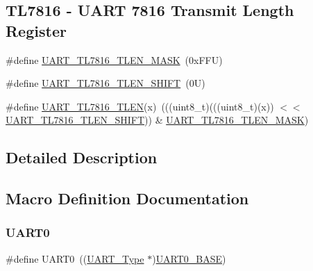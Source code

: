 \subsection*{T\+L7816 -\/ U\+A\+RT 7816 Transmit Length Register}
\begin{DoxyCompactItemize}
\item 
\#define \mbox{\hyperlink{group___u_a_r_t___register___masks_ga000fb6043015c4cb478d32febfb4a913}{U\+A\+R\+T\+\_\+\+T\+L7816\+\_\+\+T\+L\+E\+N\+\_\+\+M\+A\+SK}}~(0x\+F\+F\+U)
\item 
\#define \mbox{\hyperlink{group___u_a_r_t___register___masks_gaafcee96c5728fbbbc56c3b2ea55bd753}{U\+A\+R\+T\+\_\+\+T\+L7816\+\_\+\+T\+L\+E\+N\+\_\+\+S\+H\+I\+FT}}~(0\+U)
\item 
\#define \mbox{\hyperlink{group___u_a_r_t___register___masks_gaf537ccbe6ddd913ae8f3a988393519e4}{U\+A\+R\+T\+\_\+\+T\+L7816\+\_\+\+T\+L\+EN}}(x)~(((uint8\+\_\+t)(((uint8\+\_\+t)(x)) $<$$<$ \mbox{\hyperlink{group___u_a_r_t___register___masks_gaafcee96c5728fbbbc56c3b2ea55bd753}{U\+A\+R\+T\+\_\+\+T\+L7816\+\_\+\+T\+L\+E\+N\+\_\+\+S\+H\+I\+FT}})) \& \mbox{\hyperlink{group___u_a_r_t___register___masks_ga000fb6043015c4cb478d32febfb4a913}{U\+A\+R\+T\+\_\+\+T\+L7816\+\_\+\+T\+L\+E\+N\+\_\+\+M\+A\+SK}})
\end{DoxyCompactItemize}


\subsection{Detailed Description}


\subsection{Macro Definition Documentation}
\mbox{\label{group___u_a_r_t___register___masks_ga0508661f121639ffdee7de2353a0def2}} 
\subsubsection{\texorpdfstring{U\+A\+R\+T0}{UART0}}
{\footnotesize\ttfamily \#define U\+A\+R\+T0~((\mbox{\hyperlink{struct_u_a_r_t___type}{U\+A\+R\+T\+\_\+\+Type}} $\ast$)\mbox{\hyperlink{group___u_a_r_t___register___masks_ga7a07348b4332ff6b88abf6092347deba}{U\+A\+R\+T0\+\_\+\+B\+A\+SE}})}

